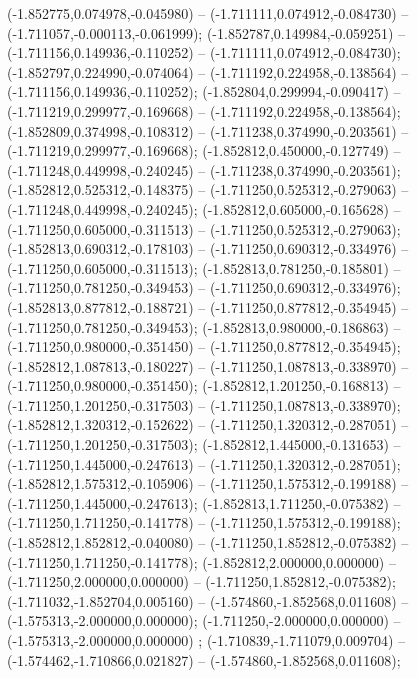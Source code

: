  (-1.852775,0.074978,-0.045980) -- (-1.711111,0.074912,-0.084730) -- (-1.711057,-0.000113,-0.061999);
 (-1.852787,0.149984,-0.059251) -- (-1.711156,0.149936,-0.110252) -- (-1.711111,0.074912,-0.084730);
 (-1.852797,0.224990,-0.074064) -- (-1.711192,0.224958,-0.138564) -- (-1.711156,0.149936,-0.110252);
 (-1.852804,0.299994,-0.090417) -- (-1.711219,0.299977,-0.169668) -- (-1.711192,0.224958,-0.138564);
 (-1.852809,0.374998,-0.108312) -- (-1.711238,0.374990,-0.203561) -- (-1.711219,0.299977,-0.169668);
 (-1.852812,0.450000,-0.127749) -- (-1.711248,0.449998,-0.240245) -- (-1.711238,0.374990,-0.203561);
 (-1.852812,0.525312,-0.148375) -- (-1.711250,0.525312,-0.279063) -- (-1.711248,0.449998,-0.240245);
 (-1.852812,0.605000,-0.165628) -- (-1.711250,0.605000,-0.311513) -- (-1.711250,0.525312,-0.279063);
 (-1.852813,0.690312,-0.178103) -- (-1.711250,0.690312,-0.334976) -- (-1.711250,0.605000,-0.311513);
 (-1.852813,0.781250,-0.185801) -- (-1.711250,0.781250,-0.349453) -- (-1.711250,0.690312,-0.334976);
 (-1.852813,0.877812,-0.188721) -- (-1.711250,0.877812,-0.354945) -- (-1.711250,0.781250,-0.349453);
 (-1.852813,0.980000,-0.186863) -- (-1.711250,0.980000,-0.351450) -- (-1.711250,0.877812,-0.354945);
 (-1.852812,1.087813,-0.180227) -- (-1.711250,1.087813,-0.338970) -- (-1.711250,0.980000,-0.351450);
 (-1.852812,1.201250,-0.168813) -- (-1.711250,1.201250,-0.317503) -- (-1.711250,1.087813,-0.338970);
 (-1.852812,1.320312,-0.152622) -- (-1.711250,1.320312,-0.287051) -- (-1.711250,1.201250,-0.317503);
 (-1.852812,1.445000,-0.131653) -- (-1.711250,1.445000,-0.247613) -- (-1.711250,1.320312,-0.287051);
 (-1.852812,1.575312,-0.105906) -- (-1.711250,1.575312,-0.199188) -- (-1.711250,1.445000,-0.247613);
 (-1.852813,1.711250,-0.075382) -- (-1.711250,1.711250,-0.141778) -- (-1.711250,1.575312,-0.199188);
 (-1.852812,1.852812,-0.040080) -- (-1.711250,1.852812,-0.075382) -- (-1.711250,1.711250,-0.141778);
 (-1.852812,2.000000,0.000000) -- (-1.711250,2.000000,0.000000) -- (-1.711250,1.852812,-0.075382);
 (-1.711032,-1.852704,0.005160) -- (-1.574860,-1.852568,0.011608) -- (-1.575313,-2.000000,0.000000);
 (-1.711250,-2.000000,0.000000) -- (-1.575313,-2.000000,0.000000) ;
 (-1.710839,-1.711079,0.009704) -- (-1.574462,-1.710866,0.021827) -- (-1.574860,-1.852568,0.011608);
